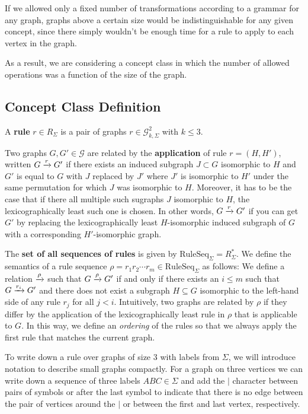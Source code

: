 \documentclass[]{article}
\def\RuleSeq{\mathrm{RuleSeq}\xspace}
\def\Graphs{\mathcal{G}\xspace}
\begin{document}
If we allowed only a fixed number of transformations according to a grammar for
any graph, graphs above a certain size would be indistinguishable for any given
concept, since there simply wouldn't be enough time for a rule to apply to each
vertex in the graph.

As a result, we are considering a concept class in which the number of allowed
operations was a function of the size of the graph.

\subsection{Concept Class Definition}

A \textbf{rule} $r \in R_{\Sigma}$ is a pair of graphs
$r \in \Graphs_{k,\Sigma}^2$ with $k \leq 3$.

Two graphs $G,G' \in \Graphs$ are related by the \textbf{application} of rule
$r = (H,H')$, written $G \xrightarrow{r} G'$ if there exists an induced subgraph $J \subset G$
isomorphic to $H$ and $G'$ is equal to $G$ with $J$ replaced by $J'$ where $J'$
is isomorphic to $H'$ under the same permutation for which $J$ was isomorphic to
$H$. Moreover, it has to be the case that if there all multiple such sugraphs
$J$ isomorphic to $H$, the lexicographically least such one is chosen.
In other words, $G \xrightarrow{r} G'$ if you can get $G'$ by replacing the
lexicographically least $H$-isomorphic induced subgraph of $G$ with a corresponding
$H'$-isomorphic graph.

The \textbf{set of all sequences of rules} is given by
$\RuleSeq_{\Sigma} = R_{\Sigma}^*$. We define the semantics of a rule sequence
$\rho = r_1r_2\dotsm r_m \in \RuleSeq_{\Sigma}$ as follows: We define a relation
$\xrightarrow{\rho}$ such that $G \xrightarrow{\rho} G'$ if and only if there exists an
$i\leq m$ such that $G\xrightarrow{r_i} G'$ and there does not exist a subgraph
$H \subseteq G$ isomorphic to the left-hand side of any rule $r_j$ for all
$j < i$. Intuitively, two graphs are related by $\rho$ if they differ by the
application of the lexicographically least rule in $\rho$ that is applicable to
$G$. In this way, we define an \emph{ordering} of the rules so that we always apply
the first rule that matches the current graph.

To write down a rule over graphs of size $3$ with labels from $\Sigma$, we will
introduce notation to describe small graphs compactly. For a graph on three
vertices we can write down a sequence of three labels $ABC \in \Sigma$ and add
the $|$ character between pairs of symbols or after the last symbol to indicate
that there is no edge between the pair of vertices around the $|$ or between the
first and last vertex, respectively.
\end{document}
